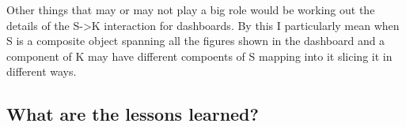 \documentclass[../main.tex]{subfiles}
\begin{document}
Other things that may or may not play a big role would be working out the details of the S->K interaction for dashboards. By this I particularly mean when S is a composite object spanning all the figures shown in the dashboard and a component of K may have different compoents of S mapping into it slicing it in different ways.
\subsection{What are the lessons learned?}
\end{document}
